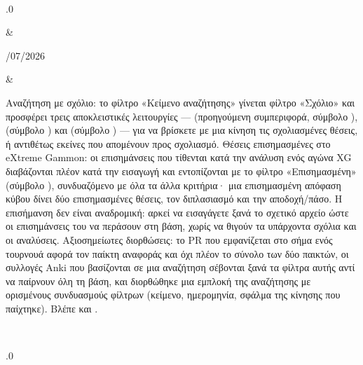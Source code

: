 \documentclass[letterpaper,10pt,greek]{sphinxmanual}
\begin{document}
\begin{savenotes}
\begin{longtable}{}
\begin{varwidth}[t]{}
\sphinxbeforeendvarwidth
\end{varwidth}%
\\
\sphinxhline\begin{varwidth}[t]{}
.0
\sphinxbeforeendvarwidth
\end{varwidth}%
&\begin{varwidth}[t]{}
/07/2026
\sphinxbeforeendvarwidth
\end{varwidth}%
&\begin{varwidth}[t]{}
\sphinxAtStartPar
Αναζήτηση με σχόλιο: το φίλτρο «Κείμενο αναζήτησης» γίνεται φίλτρο «Σχόλιο» και προσφέρει τρεις αποκλειστικές λειτουργίες —  (προηγούμενη συμπεριφορά, σύμβολο ),  (σύμβολο ) και  (σύμβολο ) — για να βρίσκετε με μια κίνηση τις σχολιασμένες θέσεις, ή αντιθέτως εκείνες που απομένουν προς σχολιασμό. Θέσεις επισημασμένες στο eXtreme Gammon: οι επισημάνσεις που τίθενται κατά την ανάλυση ενός αγώνα XG διαβάζονται πλέον κατά την εισαγωγή και εντοπίζονται με το φίλτρο «Επισημασμένη» (σύμβολο ), συνδυαζόμενο με όλα τα άλλα κριτήρια· μια επισημασμένη απόφαση κύβου δίνει δύο επισημασμένες θέσεις, τον διπλασιασμό και την αποδοχή/πάσο. Η επισήμανση δεν είναι αναδρομική: αρκεί να εισαγάγετε ξανά το σχετικό αρχείο  ώστε οι επισημάνσεις του να περάσουν στη βάση, χωρίς να θιγούν τα υπάρχοντα σχόλια και οι αναλύσεις. Αξιοσημείωτες διορθώσεις: το PR που εμφανίζεται στο σήμα ενός τουρνουά αφορά τον παίκτη αναφοράς και όχι πλέον το σύνολο των δύο παικτών, οι συλλογές Anki που βασίζονται σε μια αναζήτηση σέβονται ξανά τα φίλτρα αυτής αντί να παίρνουν όλη τη βάση, και διορθώθηκε μια εμπλοκή της αναζήτησης με ορισμένους συνδυασμούς φίλτρων (κείμενο, ημερομηνία, σφάλμα της κίνησης που παίχτηκε). Βλέπε {\hyperref[\detokenize{cmd_mode:cmd-mode}]{}} και {\hyperref[\detokenize{manuel:manuel}]{}}.
\sphinxbeforeendvarwidth
\end{varwidth}%
\\
\sphinxhline\begin{varwidth}[t]{}
.0
\sphinxbeforeendvarwidth
\end{varwidth}%

\end{longtable}
\end{savenotes}
\end{document}
